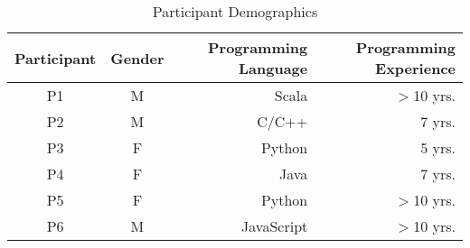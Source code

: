 
\begin{table}[!htbp]
\caption{Participant Demographics}
\label{tab:participant-demographics}
\centering
\begin{tabularx}{0.47\textwidth}{CcRR}
\toprule
	\textbf{Participant} & \textbf{Gender} & \textbf{Programming \mbox{Language}} & \textbf{Programming Experience} \\
\midrule
	P1 & M & Scala & $>$10 yrs. \\
	P2 & M & C/C++ & 7 yrs. \\
	P3 & F & Python & 5 yrs. \\
	P4 & F & Java & 7 yrs. \\
	P5 & F & Python & $>$10 yrs. \\
	P6 & M & JavaScript & $>$10 yrs. \\
\bottomrule
\end{tabularx}
\parnotes
\end{table}